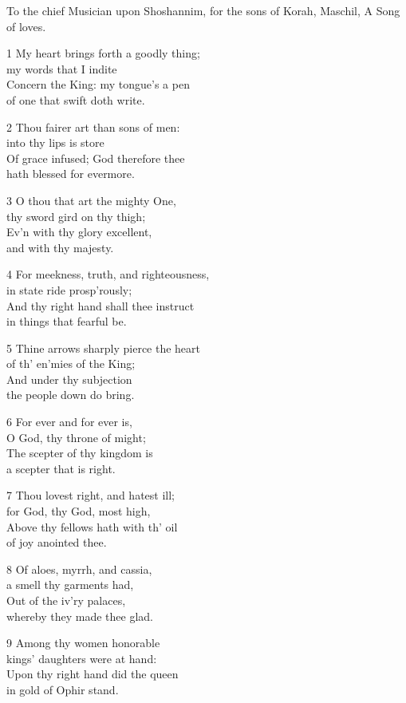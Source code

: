\begin{multicols}{3}
To the chief Musician upon Shoshannim,
for the sons of Korah, Maschil, A Song of loves.

1 My heart brings forth a goodly thing;\\
my words that I indite\\
Concern the King: my tongue’s a pen\\
of one that swift doth write.

2 Thou fairer art than sons of men:\\
into thy lips is store\\
Of grace infused; God therefore thee\\
hath blessed for evermore.

3 O thou that art the mighty One,\\
thy sword gird on thy thigh;\\
Ev’n with thy glory excellent,\\
and with thy majesty.

4 For meekness, truth, and righteousness,\\
in state ride prosp’rously;\\
And thy right hand shall thee instruct\\
in things that fearful be.

5 Thine arrows sharply pierce the heart\\
of th’ en’mies of the King;\\
And under thy subjection\\
the people down do bring.

6 For ever and for ever is,\\
O God, thy throne of might;\\
The scepter of thy kingdom is\\
a scepter that is right.

7 Thou lovest right, and hatest ill;\\
for God, thy God, most high,\\
Above thy fellows hath with th’ oil\\
of joy anointed thee.

8 Of aloes, myrrh, and cassia,\\
a smell thy garments had,\\
Out of the iv’ry palaces,\\
whereby they made thee glad.

9 Among thy women honorable\\
kings’ daughters were at hand:\\
Upon thy right hand did the queen\\
in gold of Ophir stand.


\end{multicols}
